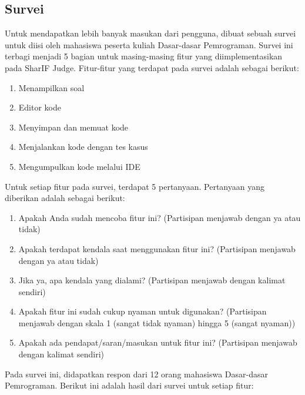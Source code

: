 \subsection{Survei}
\label{subsec:survei}

Untuk mendapatkan lebih banyak masukan dari pengguna, dibuat sebuah survei untuk diisi oleh mahasiswa peserta kuliah Dasar-dasar Pemrograman. Survei ini terbagi menjadi 5 bagian untuk masing-masing fitur yang diimplementasikan pada SharIF Judge. Fitur-fitur yang terdapat pada survei adalah sebagai berikut:

\begin{enumerate}
    \item Menampilkan soal
    \item Editor kode
    \item Menyimpan dan memuat kode
    \item Menjalankan kode dengan tes kasus
    \item Mengumpulkan kode melalui IDE
\end{enumerate}

Untuk setiap fitur pada survei, terdapat 5 pertanyaan. Pertanyaan yang diberikan adalah sebagai berikut:

\begin{enumerate}
    \item Apakah Anda sudah mencoba fitur ini? (Partisipan menjawab dengan ya atau tidak)
    \item Apakah terdapat kendala saat menggunakan fitur ini? (Partisipan menjawab dengan ya atau tidak)
    \item Jika ya, apa kendala yang dialami? (Partisipan menjawab dengan kalimat sendiri)
    \item Apakah fitur ini sudah cukup nyaman untuk digunakan? (Partisipan menjawab dengan skala 1 (sangat tidak nyaman) hingga 5 (sangat nyaman))
    \item Apakah ada pendapat/saran/masukan untuk fitur ini? (Partisipan menjawab dengan kalimat sendiri)
\end{enumerate}

Pada survei ini, didapatkan respon dari 12 orang mahasiswa Dasar-dasar Pemrograman. Berikut ini adalah hasil dari survei untuk setiap fitur:

